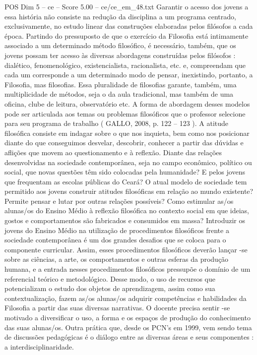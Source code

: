 \begin{textsample}{POS Dim 5 – ce – Score 5.00 – ce/ce\_em\_48.txt}
Garantir o acesso dos jovens a essa história não consiste na redução da disciplina a um programa centrado, exclusivamente, no estudo linear das construções elaboradas pelos filósofos a cada época.
Partindo do pressuposto de que o exercício da Filosofia está intimamente associado a um determinado método filosófico, é necessário, também, que os jovens possam ter acesso às diversas abordagens construídas pelos filósofos : dialético, fenomenológico, existencialista, racionalista, etc. e, compreendam que cada um corresponde a um determinado modo de pensar, inexistindo, portanto, a Filosofia, mas filosofias.
Essa pluralidade de filosofias garante, também, uma multiplicidade de métodos, seja o da aula tradicional, mas também de uma oficina, clube de leitura, observatório etc.
A forma de abordagem desses modelos pode ser articulada aos temas ou problemas filosóficos que o professor selecione para seu programa de trabalho ( GALLO, 2008, p. 122 – 123 ).
A atitude filosófica consiste em indagar sobre o que nos inquieta, bem como nos posicionar diante do que conseguimos desvelar, descobrir, conhecer a partir das dúvidas e aflições que movem ao questionamento e à reflexão.
Diante das relações desenvolvidas na sociedade contemporânea, seja no campo econômico, político ou social, que novas questões têm sido colocadas pela humanidade?
E pelos jovens que frequentam as escolas públicas do Ceará?
O atual modelo de sociedade tem permitido aos jovens construir atitudes filosóficas em relação ao mundo existente?
Permite pensar e lutar por outras relações possíveis?
Como estimular as/os alunas/os do Ensino Médio à reflexão filosófica no contexto social em que ideias, gostos e comportamentos são fabricados e consumidos em massa?
Introduzir os jovens do Ensino Médio na utilização de procedimentos filosóficos frente a sociedade contemporânea é um dos grandes desafios que se coloca para o componente curricular.
Assim, esses procedimentos filosóficos deverão lançar -se sobre as ciências, a arte, os comportamentos e outras esferas da produção humana, e a entrada nesses procedimentos filosóficos pressupõe o domínio de um referencial teórico e metodológico.
Desse modo, o uso de recursos que potencializam o estudo dos objetos de aprendizagem, assim como sua contextualização, fazem as/os alunas/os adquirir competências e habilidades da Filosofia a partir das suas diversas narrativas.
O docente precisa sentir -se motivado a diversificar o uso, a forma e os espaços de produção do conhecimento das suas alunas/os.
Outra prática que, desde os PCN’s em 1999, vem sendo tema de discussões pedagógicas é o diálogo entre as diversas áreas e seus componentes : a interdisciplinaridade.

\end{textsample}
